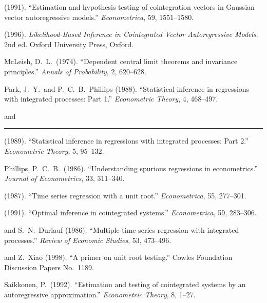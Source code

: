 \begin{description}
\item[] \hspace{2em} (1991). ``Estimation and hypothesis testing of cointegration vectors in Gaussian vector autoregressive models.'' \emph{Econometrica}, 59, 1551--1580.

\item[] \hspace{2em} (1996). \emph{Likelihood-Based Inference in Cointegrated Vector Autoregressive Models}. 2nd ed. Oxford University Press, Oxford.

\item McLeish, D.\ L.\ (1974). ``Dependent central limit theorems and invariance principles.'' \emph{Annals of Probability}, 2, 620--628.

\item Park, J.\ Y.\ and P.\ C.\ B.\ Phillips (1988). ``Statistical inference in regressions with integrated processes: Part 1.'' \emph{Econometric Theory}, 4, 468--497.

\item[] \hspace{2em} and \rule{2em}{0.4pt} (1989). ``Statistical inference in regressions with integrated processes: Part 2.'' \emph{Econometric Theory}, 5, 95--132.

\item Phillips, P.\ C.\ B.\ (1986). ``Understanding spurious regressions in econometrics.'' \emph{Journal of Econometrics}, 33, 311--340.

\item[] \hspace{2em} (1987). ``Time series regression with a unit root.'' \emph{Econometrica}, 55, 277--301.

\item[] \hspace{2em} (1991). ``Optimal inference in cointegrated systems.'' \emph{Econometrica}, 59, 283--306.

\item[] \hspace{2em} and S.\ N.\ Durlauf (1986). ``Multiple time series regression with integrated processes.'' \emph{Review of Economic Studies}, 53, 473--496.

\item[] \hspace{2em} and Z.\ Xiao (1998). ``A primer on unit root testing.'' Cowles Foundation Discussion Papers No.\ 1189.

\item Saikkonen, P.\ (1992). ``Estimation and testing of cointegrated systems by an autoregressive approximation.'' \emph{Econometric Theory}, 8, 1--27.


\end{description}
